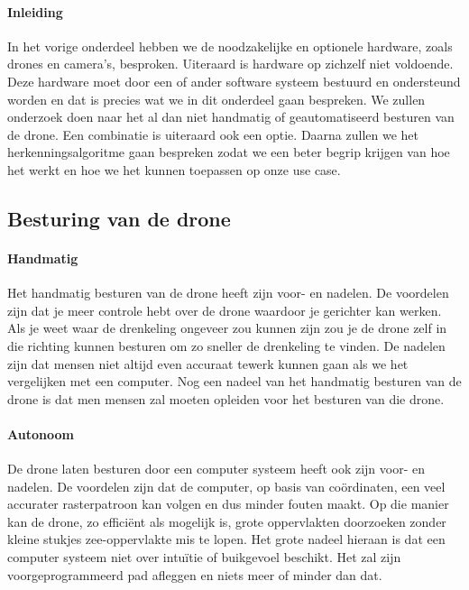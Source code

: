\paragraph{Inleiding}
In het vorige onderdeel hebben we de noodzakelijke en optionele hardware, zoals drones en camera's, besproken. Uiteraard is hardware op zichzelf niet voldoende. Deze hardware moet door een of ander software systeem bestuurd en ondersteund worden en dat is precies wat we in dit onderdeel gaan bespreken. We zullen onderzoek doen naar het al dan niet handmatig of geautomatiseerd besturen van de drone. Een combinatie is uiteraard ook een optie. Daarna zullen we het herkenningsalgoritme gaan bespreken zodat we een beter begrip krijgen van hoe het werkt en hoe we het kunnen toepassen op onze use case.

\subsection{Besturing van de drone}

\paragraph{Handmatig}

Het handmatig besturen van de drone heeft zijn voor- en nadelen. De voordelen zijn dat je meer controle hebt over de drone waardoor je gerichter kan werken. Als je weet waar de drenkeling ongeveer zou kunnen zijn zou je de drone zelf in die richting kunnen besturen om zo sneller de drenkeling te vinden. De nadelen zijn dat mensen niet altijd even accuraat tewerk kunnen gaan als we het vergelijken met een computer. Nog een nadeel van het handmatig besturen van de drone is dat men mensen zal moeten opleiden voor het besturen van die drone.

\paragraph{Autonoom}

De drone laten besturen door een computer systeem heeft ook zijn voor- en nadelen. De voordelen zijn dat de computer, op basis van coördinaten, een veel accurater rasterpatroon kan volgen en dus minder fouten maakt. Op die manier kan de drone, zo efficiënt als mogelijk is, grote oppervlakten doorzoeken zonder kleine stukjes zee-oppervlakte mis te lopen. Het grote nadeel hieraan is dat een computer systeem niet over intuïtie of buikgevoel beschikt. Het zal zijn voorgeprogrammeerd pad afleggen en niets meer of minder dan dat.  

